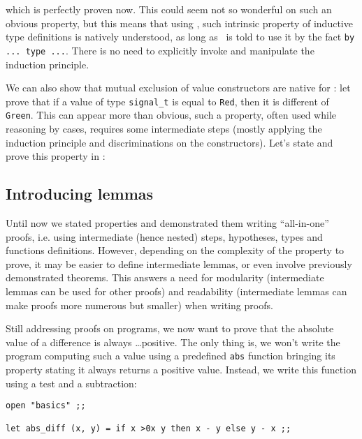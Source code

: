 \documentclass[11pt,a4paper,twoside,onecolumn,fullpage]{article}
\begin{document}
{\scriptsize
}

\noindent which is perfectly proven now. This could seem not so
wonderful on such an obvious property, but this means that using
\zenon, such intrinsic property of inductive type definitions is
natively understood, as long as \zenon\ is told to use it by the fact
\lstinline"by ... type ...". There is no need to explicitly invoke
and manipulate the induction principle.

\medskip
We can also show that mutual exclusion of value constructors are
native for \zenon: let prove that if a value of type
\lstinline"signal_t" is equal to \lstinline"Red", then it is different
of \lstinline"Green". This can appear more than obvious, such a
property, often used while reasoning by cases, requires some
intermediate steps (mostly applying the induction principle and
discriminations on the constructors). Let's state and prove this
property in \focal:

{\scriptsize
}

\subsection{Introducing lemmas}
Until now we stated properties and demonstrated them writing
``all-in-one'' proofs, i.e. using intermediate (hence nested) steps,
hypotheses, types and functions definitions. However, depending on the
complexity of the property to prove, it may be easier to define
intermediate lemmas, or even involve previously demonstrated
theorems. This answers a need for modularity (intermediate lemmas can
be used for other proofs) and readability (intermediate lemmas can
make proofs more numerous but smaller) when writing proofs.

\medskip
Still addressing proofs on programs, we now want to prove that the
absolute value of a difference is always \ldots positive. The only
thing is, we won't write the program computing such a value using a
predefined {\tt abs} function bringing its property stating it always
returns a positive value. Instead, we write this function using a test
and a subtraction:

{\scriptsize
\begin{lstlisting}[caption=lemmas.fcl]
open "basics" ;;

let abs_diff (x, y) = if x >0x y then x - y else y - x ;;
\end{lstlisting}}
\end{document}
